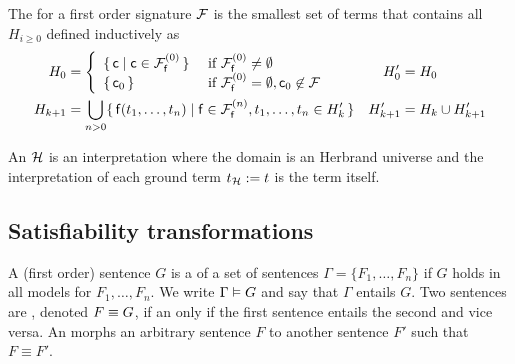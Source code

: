 \begin{definition}\label{def:hk}
	The  for a first order signature \( \mathcal{F} \)
	is the smallest set of terms that contains all \( H_{i\geq 0} \) defined inductively as
	\begin{align*}
	H_0 &=
	\left \{
	\begin{array}{ll}
	\{ \, \mc \mid \mc\in\mcFfn[0] \, \} 
	&\text{if } \mcFfn[0]\not=\emptyset
	\\
	\{ \, \mc_0 \, \}
	&\text{if } \mcFfn[0]=\emptyset, \mc_0\not\in\mcF
	\end{array}
	\right.
	&
	H'_0 &= H_0
	\\
	H_{k+1} &= \bigcup_{n> 0}
	\{ \, \mf(t_1, \ldots, t_n) \mid{} \mf\in\mcFfn[n],
	t_1, \ldots, t_n \in{} H_k' \, \}
	&
	H'_{k+1} &= H_k \cup{} H'_{k+1}
	\end{align*}
\end{definition}

\begin{definition}
	An  \( \mathcal{H} \) is an interpretation where the domain
	is an Herbrand universe
	and the interpretation of each ground term \( t_{\mathcal{H}} := t \) is the term itself.
\end{definition}





\subsection{Satisfiability transformations}\label{sec:equisatisfiability}

\begin{definition}\label{def:entailment}\label{def:equivalence}
	A (first order) sentence \( G \) is a 
	of a set of sentences
	\( \Gamma = \{ F_1,\ldots,F_n \} \) if \( G \) holds in all models for \( F_1,\ldots,F_n \).
	We write \( \Gamma\vDash G \) and say that \( \Gamma \) entails \(G\).
	Two sentences are ,
	denoted \( F \equiv G \),
	if an only if the first sentence entails the second and vice versa.
	An  morphs an arbitrary sentence \(F\)
	to another sentence \(F'\) such that \( F\equiv F'\).
\end{definition}

